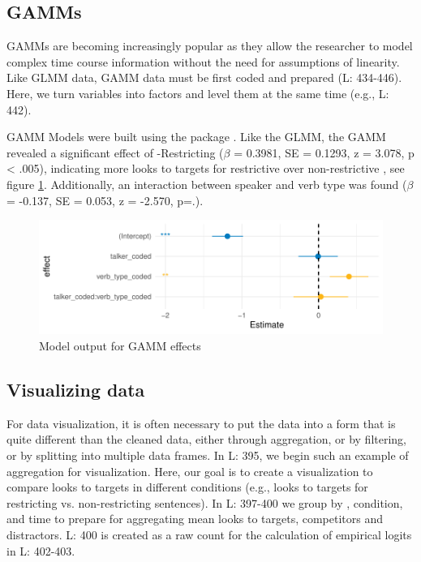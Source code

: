 \subsection{GAMMs}
GAMMs are becoming increasingly popular as they allow the researcher to model complex time course information without the need for assumptions of linearity. Like GLMM data, GAMM data must be first coded and prepared (L: 434-446). Here, we turn variables into factors and level them at the same time (e.g., L: 442). 

GAMM Models were built using the  package \parencite{mgcv_wood_2017}.
Like the GLMM, the GAMM revealed a significant effect of -Restricting ($\beta$ = 0.3981, SE = 0.1293, z = 3.078, p < .005), indicating more looks to targets for restrictive  over non-restrictive , see figure \ref{fig:model_gamm_effects}. Additionally, an interaction between speaker and verb type was found ($\beta$ = -0.137, SE = 0.053, z = -2.570, p=.). 
\begin{figure}[H]
    \centering
    \includegraphics[width=\textwidth]{figures/model_gamm_effects.pdf}
    \caption{Model output for GAMM effects}
    \label{fig:model_gamm_effects}
\end{figure}



\subsection{Visualizing data}

For data visualization, it is often necessary to put the data into a form that is quite different than the cleaned data, either through aggregation, or by filtering, or by splitting into multiple data frames. In L: 395, we begin such an example of aggregation for visualization. Here, our goal is to create a visualization to compare looks to targets in different conditions (e.g., looks to targets for  restricting vs.  non-restricting sentences). In L: 397-400 we group by , condition,   and time  to prepare for aggregating mean looks to targets, competitors and distractors. L: 400 is created as a raw count for the calculation of empirical logits in L: 402-403.

